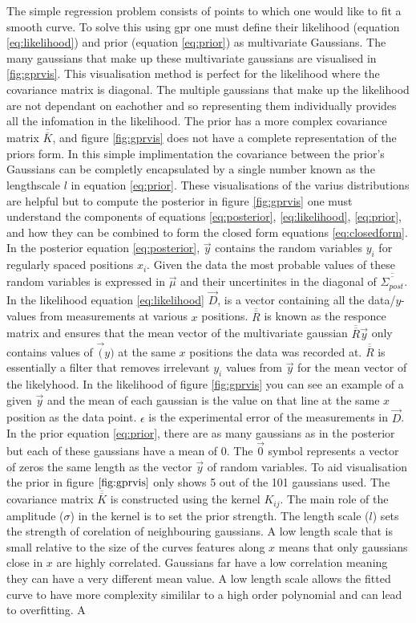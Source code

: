 The simple regression problem consists of points to which one would like to fit a smooth curve. To solve this using \gls{gpr} one must define their likelihood (equation \ref{eq:likelihood}) and prior (equation \ref{eq:prior}) as multivariate Gaussians. The many gaussians that make up these multivariate gaussians are visualised in \ref{fig:gprvis}. This visualisation method is perfect for the likelihood where the covariance matrix is diagonal. The multiple gaussians that make up the likelihood are not dependant on eachother and so representing them individually provides all the infomation in the likelihood. The prior has a more complex covariance matrix $\overline{\overline{K}}$, and figure \ref{fig:gprvis} does not have a complete representation of the priors form. In this simple implimentation the covariance between the prior's Gaussians can be completly encapsulated by a single number known as the lengthscale $l$ in equation \ref{eq:prior}. These visualisations of the varius distributions are helpful but to compute the posterior in figure \ref{fig:gprvis} one must understand the components of equations \ref{eq:posterior}, \ref{eq:likelihood}, \ref{eq:prior}, and how they can be combined to form the closed form equations \ref{eq:closedform}. In the posterior equation \ref{eq:posterior}, $\Vec{y}$ contains the random variables $y_i$ for regularly spaced positions $x_i$. Given the data the most probable values of these random variables is expressed in $\Vec{\mu}$ and their uncertinites in the diagonal of $\overline{\overline{\Sigma_{post}}}$. In the likelihood equation \ref{eq:likelihood} $\Vec{D}$, is a vector containing all the data/$y$-values from measurements at various $x$ positions. $\overline{\overline{R}}$ is known as the responce matrix and ensures that the mean vector of the multivariate gaussian $\overline{\overline{R}}\Vec{y}$ only contains values of $\Vec(y)$ at the same $x$ positions the data was recorded at. $\overline{\overline{R}}$ is essentially a filter that removes irrelevant $y_i$ values from $\Vec{y}$ for the mean vector of the likelyhood. In the likelihood of figure \ref{fig:gprvis} you can see an example of a given $\Vec{y}$ and the mean of each gaussian is the value on that line at the same $x$ position as the data point. $\epsilon$ is the experimental error of the measurements in $\Vec{D}$. In the prior equation \ref{eq:prior}, there are as many gaussians as in the posterior but each of these gaussians have a mean of 0. The $\Vec{0}$ symbol represents a vector of zeros the same length as the vector $\Vec{y}$ of random variables. To aid visualisation the prior in figure $\ref{fig:gprvis}$ only shows 5 out of the 101 gaussians used. The covariance matrix $\overline{\overline{K}}$ is constructed using the kernel $K_{ij}$. The main role of the amplitude ($\sigma$) in the kernel is to set the prior strength. The length scale ($l$) sets the strength of corelation of neighbouring gaussians. A low length scale that is small relative to the size of the curves features along $x$ means that only gaussians close in $x$ are highly correlated. Gaussians far have a low correlation meaning they can have a very different mean value. A low length scale allows the fitted curve to have more complexity simililar to a high order polynomial and can lead to overfitting. A 